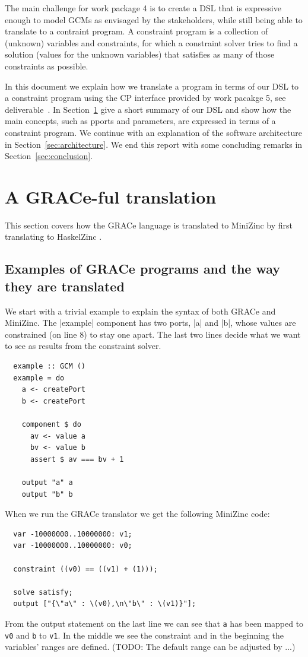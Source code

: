 \documentclass{article}
\begin{document}
The main challenge for work package 4 is to create a \ac{DSL} that is expressive
enough to model \acp{GCM} as envisaged by the stakeholders, while still being
able to translate to a contraint program. A constraint program is a
collection of (unknown) variables and constraints, for which a constraint solver
tries to find a solution (values for the unknown variables) that satisfies as
many of those constraints as possible. 

In this document we explain how we translate a program in terms of our \ac{DSL} 
to a constraint program using the \ac{CP} interface provided by work pacakge 5, 
see deliverable~\cite{}. In Section~\ref{sec:translate} give a short summary
of our \ac{DSL} and show how the main concepts, such as pports and parameters,
are expressed in terms of a constraint program. We continue with an explanation
of the software architecture in Section~\ref{sec:architecture}. We end this 
report with some concluding remarks in Section~\ref{sec:conclusion}.


\section{A GRACe-ful translation}
\label{sec:translate}


This section covers how the GRACe language is translated to MiniZinc
\cite{MiniZinc} by first translating to HaskelZinc \cite{HaskelZinc}.
%

\subsection{Examples of GRACe programs and the way they are translated}

We start with a trivial example to explain the syntax of both GRACe
and MiniZinc.
%
The |example| component has two ports, |a| and |b|, whose values are
constrained (on line 8) to stay one apart.
%
The last two lines decide what we want to see as results from the
constraint solver.
%
\begin{verbatim}
  example :: GCM ()
  example = do
    a <- createPort
    b <- createPort

    component $ do
      av <- value a
      bv <- value b
      assert $ av === bv + 1

    output "a" a
    output "b" b
\end{verbatim}

When we run the GRACe translator we get the following MiniZinc code:
%
\begin{verbatim}
  var -10000000..10000000: v1;
  var -10000000..10000000: v0;

  constraint ((v0) == ((v1) + (1)));

  solve satisfy;
  output ["{\"a\" : \(v0),\n\"b\" : \(v1)}"];
\end{verbatim}
%
From the output statement on the last line we can see that \texttt{a} has
been mapped to \texttt{v0} and \texttt{b} to \texttt{v1}.
%
In the middle we see the constraint and in the beginning the
variables' ranges are defined.
%
(TODO: The default range can be adjusted by ...)
\end{document}
